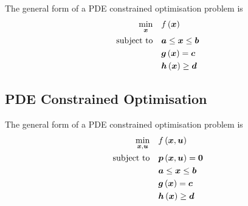 The general form of a PDE constrained optimisation problem is
\begin{equation}
  \begin{aligned}
    \min_{\vect{x}} & & & \fnof{f}{\vect{x}} \\
    \text{subject to} &&& \vect{a}\le\vect{x}\le\vect{b} \\
    & & &\fnof{\vect{g}}{\vect{x}}=\vect{c} \\
    &&& \fnof{\vect{h}}{\vect{x}}\ge\vect{d}
  \end{aligned}
\end{equation}

\subsection{PDE Constrained Optimisation}

The general form of a PDE constrained optimisation problem is
\begin{equation}
  \begin{aligned}
    \min_{\vect{x},\vect{u}} & & & \fnof{f}{\vect{x},\vect{u}} \\
    \text{subject to} & & &\fnof{\vect{p}}{\vect{x},\vect{u}}=\vect{0} \\
    &&& \vect{a}\le\vect{x}\le\vect{b} \\
    & & &\fnof{\vect{g}}{\vect{x}}=\vect{c} \\
    &&& \fnof{\vect{h}}{\vect{x}}\ge\vect{d}
  \end{aligned}
\end{equation}
